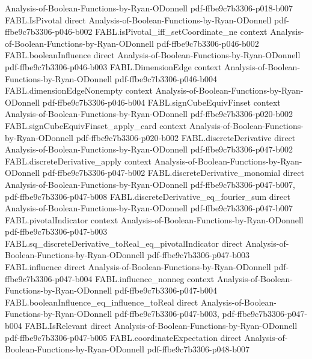 \begin{theorem}
  {Analysis-of-Boolean-Functions-by-Ryan-ODonnell}
  {pdf-ffbe9c7b3306-p018-b007}
\proofstep
  {FABL.IsPivotal}
  {direct}
  {Analysis-of-Boolean-Functions-by-Ryan-ODonnell}
  {pdf-ffbe9c7b3306-p046-b002}
\proofstep
  {FABL.isPivotal_iff_setCoordinate_ne}
  {context}
  {Analysis-of-Boolean-Functions-by-Ryan-ODonnell}
  {pdf-ffbe9c7b3306-p046-b002}
\proofstep
  {FABL.booleanInfluence}
  {direct}
  {Analysis-of-Boolean-Functions-by-Ryan-ODonnell}
  {pdf-ffbe9c7b3306-p046-b003}
\proofstep
  {FABL.DimensionEdge}
  {context}
  {Analysis-of-Boolean-Functions-by-Ryan-ODonnell}
  {pdf-ffbe9c7b3306-p046-b004}
\proofstep
  {FABL.dimensionEdgeNonempty}
  {context}
  {Analysis-of-Boolean-Functions-by-Ryan-ODonnell}
  {pdf-ffbe9c7b3306-p046-b004}
\proofstep
  {FABL.signCubeEquivFinset}
  {context}
  {Analysis-of-Boolean-Functions-by-Ryan-ODonnell}
  {pdf-ffbe9c7b3306-p020-b002}
\proofstep
  {FABL.signCubeEquivFinset_apply_card}
  {context}
  {Analysis-of-Boolean-Functions-by-Ryan-ODonnell}
  {pdf-ffbe9c7b3306-p020-b002}
\proofstep
  {FABL.discreteDerivative}
  {direct}
  {Analysis-of-Boolean-Functions-by-Ryan-ODonnell}
  {pdf-ffbe9c7b3306-p047-b002}
\proofstep
  {FABL.discreteDerivative_apply}
  {context}
  {Analysis-of-Boolean-Functions-by-Ryan-ODonnell}
  {pdf-ffbe9c7b3306-p047-b002}
\proofstep
  {FABL.discreteDerivative_monomial}
  {direct}
  {Analysis-of-Boolean-Functions-by-Ryan-ODonnell}
  {pdf-ffbe9c7b3306-p047-b007,
    pdf-ffbe9c7b3306-p047-b008}
\proofstep
  {FABL.discreteDerivative_eq_fourier_sum}
  {direct}
  {Analysis-of-Boolean-Functions-by-Ryan-ODonnell}
  {pdf-ffbe9c7b3306-p047-b007}
\proofstep
  {FABL.pivotalIndicator}
  {context}
  {Analysis-of-Boolean-Functions-by-Ryan-ODonnell}
  {pdf-ffbe9c7b3306-p047-b003}
\proofstep
  {FABL.sq_discreteDerivative_toReal_eq_pivotalIndicator}
  {direct}
  {Analysis-of-Boolean-Functions-by-Ryan-ODonnell}
  {pdf-ffbe9c7b3306-p047-b003}
\proofstep
  {FABL.influence}
  {direct}
  {Analysis-of-Boolean-Functions-by-Ryan-ODonnell}
  {pdf-ffbe9c7b3306-p047-b004}
\proofstep
  {FABL.influence_nonneg}
  {context}
  {Analysis-of-Boolean-Functions-by-Ryan-ODonnell}
  {pdf-ffbe9c7b3306-p047-b004}
\proofstep
  {FABL.booleanInfluence_eq_influence_toReal}
  {direct}
  {Analysis-of-Boolean-Functions-by-Ryan-ODonnell}
  {pdf-ffbe9c7b3306-p047-b003,
    pdf-ffbe9c7b3306-p047-b004}
\proofstep
  {FABL.IsRelevant}
  {direct}
  {Analysis-of-Boolean-Functions-by-Ryan-ODonnell}
  {pdf-ffbe9c7b3306-p047-b005}
\proofstep
  {FABL.coordinateExpectation}
  {direct}
  {Analysis-of-Boolean-Functions-by-Ryan-ODonnell}
  {pdf-ffbe9c7b3306-p048-b007}

\end{theorem}
